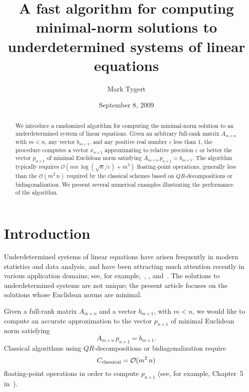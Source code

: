 \documentclass[letterpaper,12pt]{article}
\title{A fast algorithm for computing minimal-norm solutions
       to underdetermined systems of linear equations}
\author{Mark Tygert}
\date{September 8, 2009}
\def\epsilon{\varepsilon}
\def\bigoh{\mathcal{O}}
\begin{document}
\maketitle

\begin{abstract}
We introduce a randomized algorithm
for computing the minimal-norm solution
to an underdetermined system of linear equations.
Given an arbitrary full-rank matrix $A_{m \times n}$ with $m < n$,
any vector $b_{m \times 1}$, and any positive real number $\epsilon$
less than 1, the procedure computes a vector $x_{n \times 1}$
approximating to relative precision $\epsilon$ or better
the vector $p_{n \times 1}$ of minimal Euclidean norm satisfying
$A_{m \times n} \, p_{n \times 1} = b_{m \times 1}$.
The algorithm typically requires
$\bigoh( mn \, \log(\sqrt{n}/\epsilon) + m^3 )$
floating-point operations,
generally less than the $\bigoh(m^2 \, n)$ required
by the classical schemes based on $QR$-decompositions or bidiagonalization.
We present several numerical examples illustrating the performance
of the algorithm.
\end{abstract}



\section{Introduction}

Underdetermined systems of linear equations have arisen frequently
in modern statistics and data analysis, and have been attracting
much attention recently in various application domains;
see, for example,~\cite{bruckstein-donoho-elad}, \cite{candes-tao},
and~\cite{donoho}.
The solutions to underdetermined systems are not unique;
the present article focuses on the solutions whose Euclidean norms
are minimal.

Given a full-rank matrix $A_{m \times n}$ and a vector $b_{m \times 1}$,
with $m < n$, we would like to compute an accurate approximation
to the vector $p_{n \times 1}$ of minimal Euclidean norm satisfying
\begin{equation}
A_{m \times n} \, p_{n \times 1} = b_{m \times 1}.
\end{equation}
Classical algorithms using $QR$-decompositions or bidiagonalization require
\begin{equation}
\label{classical}
C_{\rm classical} = \bigoh(m^2 \, n)
\end{equation}
floating-point operations in order to compute $p_{n \times 1}$
(see, for example, Chapter~5 in~\cite{golub-van_loan}).
\end{document}
